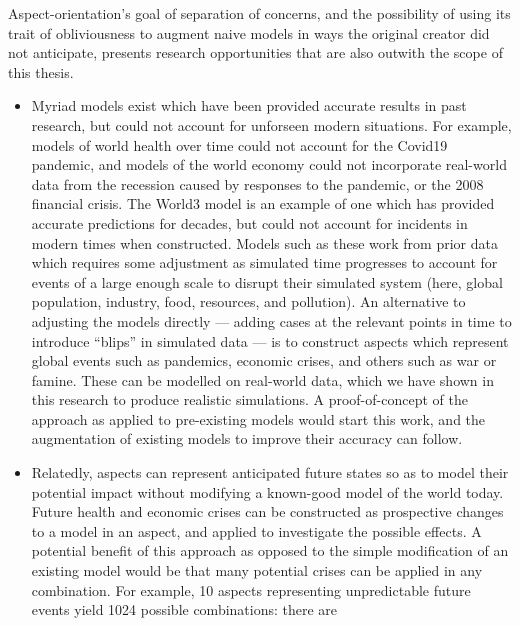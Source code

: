 
Aspect-orientation's goal of separation of concerns, and the possibility of
using its trait of obliviousness to augment naive models in ways the original
creator did not anticipate, presents research opportunities that are also
outwith the scope of this thesis.

\begin{itemize}
    \item Myriad models exist which have been provided accurate results in past
    research, but could not account for unforseen modern situations. For
    example, models of world health over time could not account for the Covid19
    pandemic, and models of the world economy could not incorporate real-world
    data from the recession caused by responses to the pandemic, or the 2008
    financial crisis. The World3 model is an example of one which has provided
    accurate predictions for decades, but could not account for incidents in
    modern times when constructed. Models such as these work from prior data which
    requires some adjustment as simulated time progresses to account for events
    of a large enough scale to disrupt their simulated system (here, global
    population, industry, food, resources, and pollution). An alternative to
    adjusting the models directly --- adding cases at the relevant points in
    time to introduce ``blips'' in simulated data --- is to construct aspects
    which represent global events such as pandemics, economic crises, and others
    such as war or famine. These can be modelled on real-world data, which we
    have shown in this research to produce realistic simulations. A
    proof-of-concept of the approach as applied to pre-existing models would
    start this work, and the augmentation of existing models to improve their
    accuracy can follow.
    \item Relatedly, aspects can represent anticipated future states so as to
    model their potential impact without modifying a known-good model of the
    world today. Future health and economic crises can be constructed as
    prospective changes to a model in an aspect, and applied to investigate the
    possible effects. A potential benefit of this approach as opposed to the
    simple modification of an existing model would be that many potential crises
    can be applied in any combination. For example, 10 aspects representing
    unpredictable future events yield 1024 possible combinations: there are

\end{itemize}
